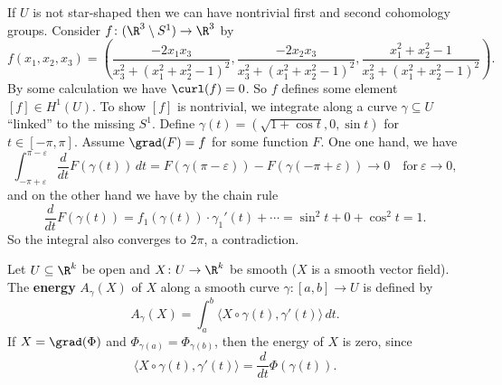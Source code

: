 \begin{example}
    If $U$ is not star-shaped then we can have nontrivial first and second cohomology groups. Consider $f \colon (\R^3\setminus S^1 ) \to \R^3$ by \[
        f(x_1,x_2,x_3) =\left( \frac{-2x_1x_3}{x_3^2+(x_1^2+x_2^2-1)^2},\frac{-2x_2x_3}{x_3^2+(x_1^2+x_2^2-1)^2},\frac{x_1^2+x_2^2-1}{x_3^2+(x_1^2+x_2^2-1)^2} \right) .
    \] By some calculation we have $\curl(f)=0$. So $f$ defines some element $[f] \in H^1(U)$. To show $[f]$ is nontrivial, we integrate along a curve $\gamma \subseteq U$ ``linked'' to the missing $S^1 $. Define $\gamma (t)=\left( \sqrt{1+\cos t} ,0,\sin t \right) $ for $t \in [-\pi,\pi]$. Assume $\grad(F)=f$ for some function $F$. One one hand, we have \[
    \int_{-\pi +\varepsilon }^{\pi-\varepsilon } \frac{d}{dt}F(\gamma (t)) \, dt=F(\gamma (\pi-\varepsilon ))-F(\gamma (-\pi+\varepsilon ))\to 0 \quad \text{for} \ \varepsilon \to 0,
    \] and on the other hand we have by the chain rule \[
    \frac{d}{dt}F(\gamma (t))=f_1(\gamma (t))\cdot \gamma_1 '(t)+\cdots =\sin ^2 t+0+ \cos ^2t=1.
    \] So the integral also converges to $2\pi$, a contradiction.
\end{example}
\begin{example}
    Let $U \subseteq \R^k$ be open and $X \colon U \to \R^k$ be smooth ($X$ is a smooth vector field). The \textbf{energy} $A_{\gamma }(X)$ of $X$ along a smooth curve $\gamma  \colon [a,b] \to U$ is defined by \[
        A_{\gamma} (X)=\int_{a}^{b} \langle X \circ \gamma (t),\gamma '(t) \rangle  \, dt.
    \] If $X=\grad (\Phi)$ and $\Phi_{\gamma (a)}=\Phi_{\gamma (b)}$, then the energy of $X$ is zero, since \[
    \langle X \circ \gamma (t),\gamma '(t) \rangle =\frac{d}{dt}\Phi(\gamma (t)).
    \] 
\end{example}

